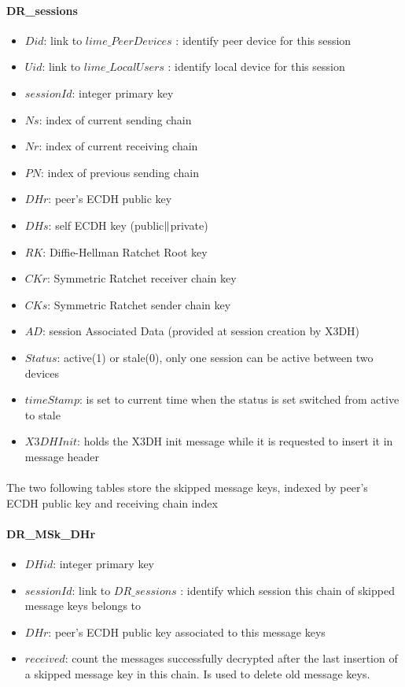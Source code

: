 \documentclass[a4paper,11pt]{article}
\begin{document}
    \paragraph*{DR\_sessions}
    \begin{itemize}
      \item $Did$: link to $lime\_PeerDevices$ : identify peer device for this session
      \item $Uid$: link to $lime\_LocalUsers$ : identify local device for this session
      \item $sessionId$: integer primary key
      \item $Ns$: index of current sending chain
      \item $Nr$: index of current receiving chain
      \item $PN$: index of previous sending chain
      \item $DHr$: peer's ECDH public key
      \item $DHs$: self ECDH key (public$\Arrowvert $private)
      \item $RK$: Diffie-Hellman Ratchet Root key
      \item $CKr$: Symmetric Ratchet receiver chain key
      \item $CKs$: Symmetric Ratchet sender chain key
      \item $AD$: session Associated Data (provided at session creation by X3DH)
      \item $Status$: active(1) or stale(0), only one session can be active between two devices
      \item $timeStamp$: is set to current time when the status is set switched from active to stale
      \item $X3DHInit$: holds the X3DH init message while it is requested to insert it in message header
    \end{itemize}
    
    \paragraph*{}The two following tables store the skipped message keys, indexed by peer's ECDH public key and receiving chain index
    \paragraph*{DR\_MSk\_DHr}
    \begin{itemize}
      \item $DHid$: integer primary key
      \item $sessionId$: link to $DR\_sessions$ : identify which session this chain of skipped message keys belongs to
      \item $DHr$: peer's ECDH public key associated to this message keys
      \item $received$: count the messages successfully decrypted after the last insertion of a skipped message key in this chain. Is used to delete old message keys.
    \end{itemize}
\end{document}
